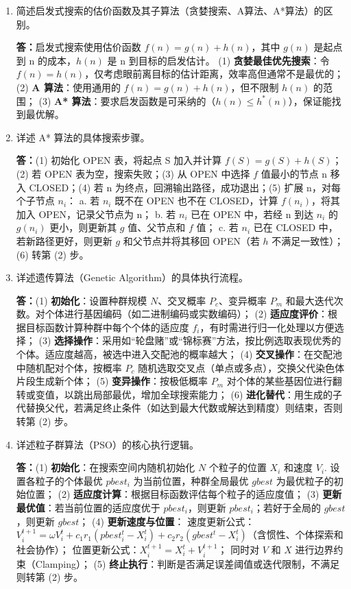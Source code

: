 \documentclass[12pt,a4paper,openany]{ctexbook}
\begin{document}
\begin{enumerate}[leftmargin=2em,itemsep=1em]
\item 简述启发式搜索的估价函数及其子算法（贪婪搜索、A算法、A*算法）的区别。

\textbf{答：}启发式搜索使用估价函数 $f(n) = g(n) + h(n)$，其中 $g(n)$ 是起点到 n 的成本，$h(n)$ 是 n 到目标的启发估计。
(1) \textbf{贪婪最佳优先搜索}：令 $f(n) = h(n)$，仅考虑眼前离目标的估计距离，效率高但通常不是最优的；
(2) \textbf{A 算法}：使用通用的 $f(n) = g(n) + h(n)$，但不限制 $h(n)$ 的范围；
(3) \textbf{A* 算法}：要求启发函数是可采纳的（$h(n) \le h^*(n)$），保证能找到最优解。

\item 详述 A* 算法的具体搜索步骤。

\textbf{答：}(1) 初始化 OPEN 表，将起点 S 加入并计算 $f(S) = g(S) + h(S)$；(2) 若 OPEN 表为空，搜索失败；(3) 从 OPEN 中选择 $f$ 值最小的节点 n 移入 CLOSED；(4) 若 n 为终点，回溯输出路径，成功退出；(5) 扩展 n，对每个子节点 $n_i$：
a. 若 $n_i$ 既不在 OPEN 也不在 CLOSED，计算 $f(n_i)$，将其加入 OPEN，记录父节点为 n；
b. 若 $n_i$ 已在 OPEN 中，若经 n 到达 $n_i$ 的 $g(n_i)$ 更小，则更新其 $g$ 值、父节点和 $f$ 值；
c. 若 $n_i$ 已在 CLOSED 中，若新路径更好，则更新 $g$ 和父节点并将其移回 OPEN（若 $h$ 不满足一致性）；
(6) 转第 (2) 步。

\item 详述遗传算法（Genetic Algorithm）的具体执行流程。

\textbf{答：}(1) \textbf{初始化}：设置种群规模 $N$、交叉概率 $P_c$、变异概率 $P_m$ 和最大迭代次数。对个体进行基因编码（如二进制编码或实数编码）；
(2) \textbf{适应度评价}：根据目标函数计算种群中每个个体的适应度 $f_i$，有时需进行归一化处理以方便选择；
(3) \textbf{选择操作}：采用如“轮盘赌”或“锦标赛”方法，按比例选取表现优秀的个体。适应度越高，被选中进入交配池的概率越大；
(4) \textbf{交叉操作}：在交配池中随机配对个体，按概率 $P_c$ 随机选取交叉点（单点或多点），交换父代染色体片段生成新个体；
(5) \textbf{变异操作}：按极低概率 $P_m$ 对个体的某些基因位进行翻转或变值，以跳出局部最优，增加全球搜索能力；
(6) \textbf{进化替代}：用生成的子代替换父代，若满足终止条件（如达到最大代数或解达到精度）则结束，否则转第 (2) 步。

\item 详述粒子群算法（PSO）的核心执行逻辑。

\textbf{答：}(1) \textbf{初始化}：在搜索空间内随机初始化 $N$ 个粒子的位置 $X_i$ 和速度 $V_i$. 设置各粒子的个体最优 $pbest_i$ 为当前位置，种群全局最优 $gbest$ 为最优粒子的初始位置；
(2) \textbf{适应度计算}：根据目标函数评估每个粒子的适应度值；
(3) \textbf{更新最优值}：若当前位置的适应度优于 $pbest_i$，则更新 $pbest_i$；若好于全局的 $gbest$，则更新 $gbest$；
(4) \textbf{更新速度与位置}：
速度更新公式：$V_i^{t+1} = \omega V_i^t + c_1 r_1 (pbest_i^t - X_i^t) + c_2 r_2 (gbest^t - X_i^t)$（含惯性、个体探索和社会协作）；
位置更新公式：$X_i^{t+1} = X_i^t + V_i^{t+1}$；
同时对 $V$ 和 $X$ 进行边界约束（Clamping）；
(5) \textbf{终止执行}：判断是否满足误差阈值或迭代限制，不满足则转第 (2) 步。


\end{enumerate}
\end{document}
